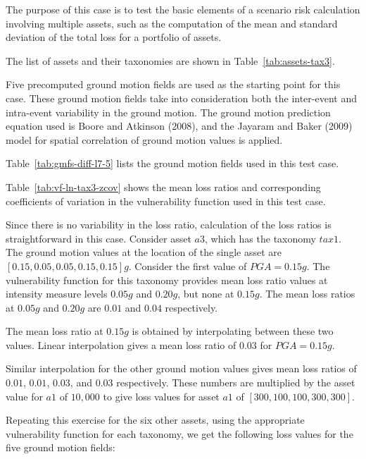 The purpose of this case is to test the basic elements of a scenario risk calculation involving multiple assets, such as the computation of the mean and standard deviation of the total loss for a portfolio of assets.


The list of assets and their taxonomies are shown in Table~\ref{tab:assets-tax3}.

Five precomputed ground motion fields are used as the starting point for this case. These ground motion fields take into consideration both the inter-event and intra-event variability in the ground motion. The ground motion prediction equation used is Boore and Atkinson (2008), and the Jayaram and Baker (2009) model for spatial correlation of ground motion values is applied.



Table~\ref{tab:gmfs-diff-l7-5} lists the ground motion fields used in this test case.




Table~\ref{tab:vf-ln-tax3-zcov} shows the mean loss ratios and corresponding coefficients of variation in the vulnerability function used in this test case.

Since there is no variability in the loss ratio, calculation of the loss ratios is straightforward in this case. Consider asset $a3$, which has the taxonomy $tax1$.  The ground motion values at the location of the single asset are $[0.15, 0.05, 0.05, 0.15, 0.15] g$. Consider the first value of $PGA = 0.15 g$. The vulnerability function for this taxonomy provides mean loss ratio values at intensity measure levels $0.05 g$ and $0.20 g$, but none at $0.15 g$. The mean loss ratios at $0.05 g$ and $0.20 g$ are $0.01$ and $0.04$ respectively.

The mean loss ratio at $0.15 g$ is obtained by interpolating between these two values. Linear interpolation gives a mean loss ratio of $0.03$ for $PGA = 0.15 g$.

Similar interpolation for the other ground motion values gives mean loss ratios of $0.01$, $0.01$, $0.03$, and $0.03$ respectively. These numbers are multiplied by the asset value for $a1$ of $10,000$ to give loss values for asset $a1$ of $[300, 100, 100, 300, 300]$.

Repeating this exercise for the six other assets, using the appropriate vulnerability function for each taxonomy, we get the following loss values for the five ground motion fields:

